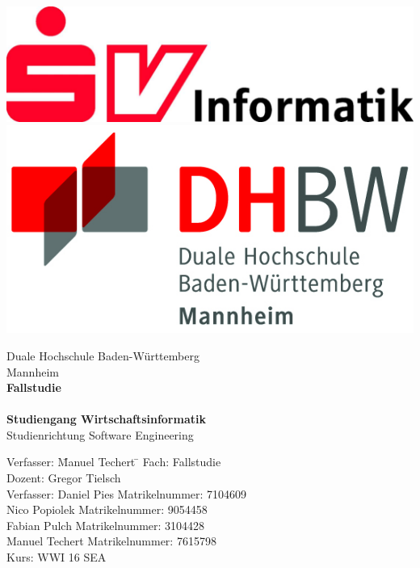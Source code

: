\begin{titlepage}
\begin{minipage}{\textwidth}
		\vspace{-2cm}
		\noindent \includegraphics[scale=0.15]{img/firmenlogo.jpg} 
		\hfill   \includegraphics{img/logo.jpg}
\end{minipage}
\vspace{1em}
\sffamily
\begin{center}
	\textsf{\large{}Duale Hochschule Baden-W\"urttemberg\\[1.5mm] Mannheim}\\[4em]
	\textsf{\textbf{\Large{}Fallstudie}}\\[3mm]
	\textsf{\textbf{\Large{}\DerTitelDerArbeit}} \\[3cm]
	\textsf{\textbf{\Large{}Studiengang Wirtschaftsinformatik}\\[3mm] \textsf{Studienrichtung Software Engineering}}	
	\vspace{3em}	
	\vfill

\begin{minipage}{\textwidth}

\begin{tabbing}
	Verfasser: \hspace{0.85cm} \= Manuel Techert \hspace{0.85cm} \= \kill
	Fach: 		\> Fallstudie      \> \\[1.5mm]
	Dozent:		\> Gregor Tielsch  \> \\[3mm]
	Verfasser:  \> Daniel Pies     \> Matrikelnummer: 7104609\\[1.5mm]
				\> Nico Popiolek   \> Matrikelnummer: 9054458\\[1.5mm]
				\> Fabian Pulch    \> Matrikelnummer: 3104428\\[1.5mm]
				\> Manuel Techert  \> Matrikelnummer: 7615798\\[3mm]
	Kurs:		\> WWI 16 SEA      \> \\



\end{tabbing}
\end{minipage}
\end{center}
\end{titlepage}
